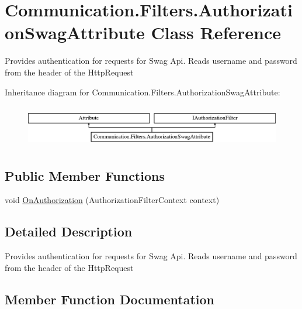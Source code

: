 \hypertarget{class_communication_1_1_filters_1_1_authorization_swag_attribute}{}\section{Communication.\+Filters.\+Authorization\+Swag\+Attribute Class Reference}
\label{class_communication_1_1_filters_1_1_authorization_swag_attribute}


Provides authentication for requests for Swag Api. Reads username and password from the header of the Http\+Request  


Inheritance diagram for Communication.\+Filters.\+Authorization\+Swag\+Attribute\+:\begin{figure}[H]
\begin{center}
\leavevmode
\includegraphics[height=1.866667cm]{class_communication_1_1_filters_1_1_authorization_swag_attribute}
\end{center}
\end{figure}
\subsection*{Public Member Functions}
\begin{DoxyCompactItemize}
\item 
void \mbox{\hyperlink{class_communication_1_1_filters_1_1_authorization_swag_attribute_a0e09022a32fad7c944f5d99ac7486647}{On\+Authorization}} (Authorization\+Filter\+Context context)
\end{DoxyCompactItemize}


\subsection{Detailed Description}
Provides authentication for requests for Swag Api. Reads username and password from the header of the Http\+Request 



\subsection{Member Function Documentation}
\mbox{\label{class_communication_1_1_filters_1_1_authorization_swag_attribute_a0e09022a32fad7c944f5d99ac7486647}} 
